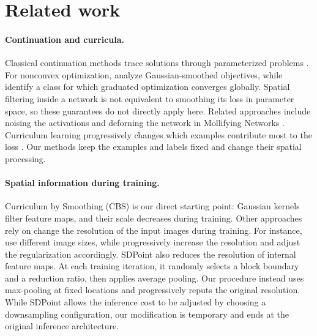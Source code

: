 \section{Related work}
\label{sec:related}
\paragraph{Continuation and curricula.}
Classical continuation methods trace solutions through parameterized problems \citep{allgower1990continuation}. For nonconvex optimization, \citet{mobahi2015gaussian} analyze Gaussian-smoothed objectives, while \citet{hazan2016graduated} identify a class for which graduated optimization converges globally. Spatial filtering inside a network is not equivalent to smoothing its loss in parameter space, so these guarantees do not directly apply here. Related approaches include noising the activations and deforning the network in Mollifying Networks \citep{gulcehre2016mollifying}. Curriculum learning progressively changes which examples contribute most to the loss \citep{bengio2009curriculum}. Our methods keep the examples and labels fixed and change their spatial processing.

\paragraph{Spatial information during training.}
Curriculum by Smoothing (CBS) \citep{sinha2020curriculum} is our direct starting point: Gaussian kernels filter feature maps, and their scale decreases during training. Other approaches rely on change the resolution of the input images during training. For instance, \citet{hoffer2019mixmatch} use different image sizes, while \citet{tan2021efficientnetv2} progressively increase the resolution and adjust the regularization accordingly. SDPoint \citep{kuen2018stochastic} also reduces the resolution of internal feature maps. At each training iteration, it randomly selects a block boundary and a reduction ratio, then applies average pooling. Our procedure instead uses max-pooling at fixed locations and progressively reputs the original resolution. While SDPoint allows the inference cost to be adjusted by choosing a downsampling configuration, our modification is temporary and ends at the original inference architecture.


